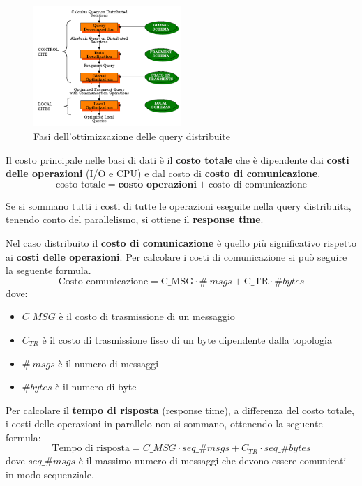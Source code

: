 \begin{figure}[!ht]
      \centering
      \includegraphics[width=0.5\textwidth]{./img/DDBMS/query.png}
      \caption{Fasi dell'ottimizzazione delle query distribuite}
      \label{fig:queryOptimization}
\end{figure}

Il costo principale nelle basi di dati è il \textbf{costo totale} che è dipendente
dai \textbf{costi delle operazioni} (I/O e CPU) e dal costo di \textbf{costo di comunicazione}.
\begin{equation*}
      \text{costo totale} = \textbf{costo operazioni} + \text{costo di comunicazione}
\end{equation*}

Se si sommano tutti i costi di tutte le operazioni eseguite nella query distribuita,
tenendo conto del parallelismo, si ottiene il \textbf{response time}.

Nel caso distribuito il \textbf{costo di comunicazione} è quello più significativo rispetto
ai \textbf{costi delle operazioni}. Per calcolare i costi di comunicazione si
può seguire la seguente formula.
\begin{equation*}
      \text{Costo comunicazione} = \text{C\_{MSG}} \cdot \#\ msgs  + \text{C\_{TR}} \cdot \#bytes
\end{equation*}
dove:
\begin{itemize}
      \item \textbf{$C\_{MSG}$} è il costo di trasmissione di un messaggio
      \item \textbf{$C_{TR}$} è il costo di trasmissione fisso di un byte
            dipendente dalla topologia
      \item \textbf{$\#\ msgs$} è il numero di messaggi
      \item \textbf{$\#bytes$} è il numero di byte
\end{itemize}

Per calcolare il \textbf{tempo di risposta} (response time), a differenza del
costo totale, i costi delle operazioni in parallelo non si sommano,
ottenendo la seguente formula:
\begin{equation*}
      \text{Tempo di risposta} = C\_{MSG} \cdot seq\_\#msgs + C_{TR} \cdot seq\_\#bytes
\end{equation*}
dove $seq\_\#msgs$ è il massimo numero di messaggi che devono essere comunicati
in modo sequenziale.

